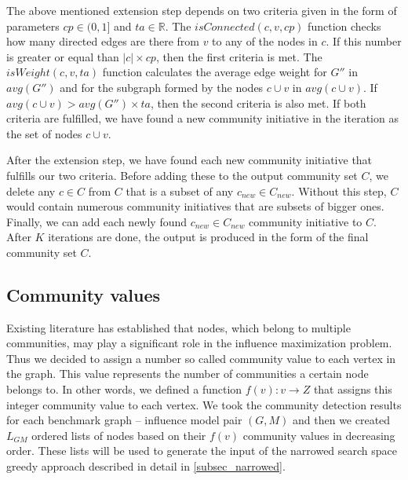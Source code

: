 \documentclass[pdflatex,sn-mathphys-num]{sn-jnl}
\begin{document}
The above mentioned extension step depends on two criteria given in the form of parameters $cp \in (0,1]$ and $ta \in \mathbb{R}$. The $isConnected(c,v,cp)$ function checks how many directed edges are there from $v$ to any of the nodes in $c$. If this number is greater or equal than $|c| \times cp$, then the first criteria is met. The $isWeight(c,v,ta)$ function calculates the average edge weight for $G''$ in $avg(G'')$ and for the subgraph formed by the nodes $c \cup v$ in $avg(c \cup v)$. If $avg(c \cup v) > avg(G'') \times ta$, then the second criteria is also met. If both criteria are fulfilled, we have found a new community initiative in the iteration as the set of nodes $c \cup v$.

After the extension step, we have found each new community initiative that fulfills our two criteria. Before adding these to the output community set $C$, we delete any $c \in C$ from $C$ that is a subset of any $c_{new} \in C_{new}$. Without this step, $C$ would contain numerous community initiatives that are subsets of bigger ones. Finally, we can add each newly found $c_{new} \in C_{new}$ community initiative to $C$. After $K$ iterations are done, the output is produced in the form of the final community set $C$.


\subsection{Community values}\label{subsec_commval}

Existing literature \cite{cim} has established that nodes, which belong to multiple communities, may play a significant role in the influence maximization problem. Thus we decided to assign a number so called community value to each vertex in the graph. This value represents the number of communities a certain node belongs to. In other words, we defined a function $f(v): v \rightarrow Z$ that assigns this integer community value to each vertex. We took the community detection results for each benchmark graph -- influence model pair $(G,M)$ and then we created $L_{GM}$ ordered lists of nodes based on their $f(v)$ community values in decreasing order. These lists will be used to generate the input of the narrowed search space greedy approach described in detail in \ref{subsec_narrowed}.

\end{document}
